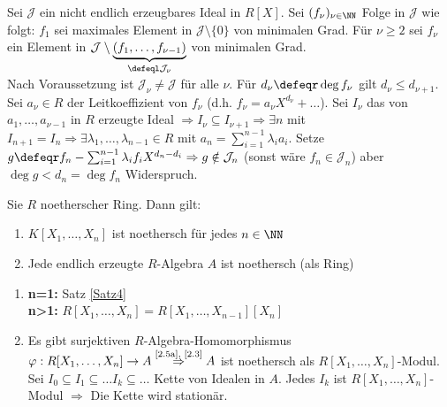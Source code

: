 \begin{Bew} 
  Sei $\mathcal{J}$ ein nicht endlich erzeugbares Ideal in $R[X]$.
  Sei $(f_{\nu})_{\nu \in \NN}$ Folge in $\mathcal{J}$ wie folgt:
  $f_1$ sei maximales Element in $\mathcal{J} \setminus \{0\}$ von minimalen
  Grad. Für $\nu \ge 2$ sei $f_{\nu}$ ein Element in $\mathcal{J} \setminus
  \underset{\defeql \mathcal{J}_{\nu}}{\underbrace{(f_1, \dots , f_{\nu - 1})}}$
  von minimalen Grad.\\
  Nach Voraussetzung ist $\mathcal{J}_{\nu} \not= \mathcal{J}$ für alle $\nu$.
  Für $d_{\nu} \defeqr \deg{f_{\nu}}$ gilt $d_{\nu} \le d_{\nu + 1}$.
  Sei $a_{\nu} \in R$ der Leitkoeffizient von $f_{\nu}$ (d.h. $f_{\nu} =
  a_{\nu} X^{d_{\nu}} + \dots$). Sei $I_{\nu}$ das von $a_1, \dots , a_{\nu -1}$
  in $R$ erzeugte Ideal $\Rightarrow I_{\nu} \subseteq I_{\nu + 1} \Rightarrow
  \exists n$ mit $I_{n+1} = I_n \Rightarrow \exists \lambda_1, \dots ,
  \lambda_{n-1} \in R$ mit $a_n = \sum_{i=1}^{n-1} \lambda_i a_i$.
  Setze $g \defeqr f_n - \sum_{i=1}^{n-1} \lambda_i f_i X^{d_n - d_i}
  \Rightarrow g \notin \mathcal{J}_n$ (sonst wäre $f_n \in \mathcal{J}_n$) aber
  $\deg{g} < d_n = \deg{f_n}$ Widerspruch.
\end{Bew}

\begin{Folg} 
  Sie $R$ noetherscher Ring. Dann gilt:
  \begin{enumerate}
    \item \label{2.5a} $K[X_1, \dots , X_n]$ ist noethersch für jedes $n \in
    \NN$
    \item Jede endlich erzeugte $R$-Algebra $A$ ist noethersch (als Ring)
  \end{enumerate}
\end{Folg}

\begin{Bew} 
  \begin{enumerate} 
    \item \textbf{n=1:} Satz \ref{Satz4}\\
          \textbf{n>1:} $R[X_1, \dots , X_n] = R[X_1, \dots , X_{n-1}][X_n]$
    \item Es gibt surjektiven $R$-Algebra-Homomorphismus $\varphi: R[X_1, \dots
          , X_n] \to A \overset{\text{\scriptsize \ref{2.5a},
          \ref{2.3}}}{\Rightarrow} A$ ist noethersch als $R[X_1, \dots ,
          X_n]$-Modul. Sei $I_0 \subseteq I_1 \subseteq \dots I_k \subseteq
          \dots$ Kette von Idealen in $A$. Jedes $I_k$ ist $R[X_1, \dots ,
          X_n]$-Modul $\Rightarrow$ Die Kette wird stationär.
\end{enumerate}
\end{Bew}
